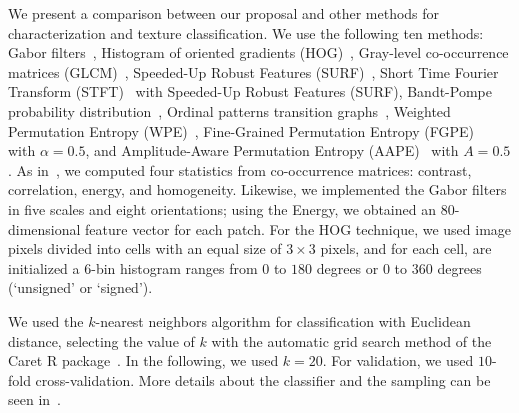 \documentclass[journal]{IEEEtran}
\begin{document}
	We present a comparison between our proposal and other methods for characterization and texture classification.
    We use the following ten methods: 
	Gabor filters~\cite{weldon1996efficient},  
    Histogram of oriented gradients (HOG)~\cite{dalal2005histograms},
	Gray-level co-occurrence matrices (GLCM)~\cite{kourgli2012texture}, 
    Speeded-Up Robust Features (SURF)~\cite{bay2006surf},
    Short Time Fourier Transform (STFT)~\cite{portnoff1980time} with Speeded-Up Robust Features (SURF),
	Bandt-Pompe probability distribution~\cite{Bandt2002Permutation}, 
	Ordinal patterns transition graphs~\cite{Borges2019Transition},
	Weighted Permutation Entropy (WPE)~\cite{Fadlallah2013Weightedpermutation},
	Fine-Grained Permutation Entropy (FGPE)~\cite{xiao2009fine} with $\alpha = 0.5$, and
	Amplitude-Aware Permutation Entropy (AAPE)~\cite{azami2016amplitude} with $A = 0.5$.
	As in~\cite{guan2019covariance}, 
    we computed four statistics from co-occurrence matrices: contrast, correlation, energy, and homogeneity.
    Likewise, we implemented the Gabor filters in five scales and eight orientations; using the Energy, we obtained an $80$-dimensional feature vector for each patch.
    For the HOG technique, we used image pixels divided into cells with an equal size of $3 \times 3$ pixels, and for each cell, are initialized a 6-bin histogram ranges from $0$ to $180$ degrees or $0$ to $360$ degrees (‘unsigned’ or ‘signed’).
	
	We used the $k$-nearest neighbors algorithm for classification with Euclidean distance, selecting the value of $k$ with the automatic grid search method of the Caret R package~\cite{kuhn2008building}.
	In the following, we used $k = 20$.
	For validation, we used $10$-fold cross-validation.
	More details about the classifier and the sampling can be seen in~\cite{mitchell1997machine}.
	
\end{document}
